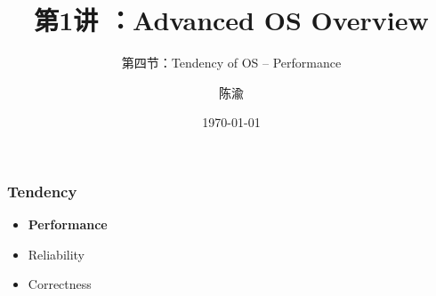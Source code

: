 


\title[第1讲]{第1讲 ：Advanced OS Overview} %
\subtitle{第四节：Tendency of OS -- Performance}
\author{陈渝} %
\date{\today} %




\begin{frame}
\titlepage %
\end{frame}

%
%
\begin{frame}
	\frametitle{Tendency}

	\begin{itemize}\huge
	\item \textbf{Performance}
	\item Reliability
	\item Correctness
	
\end{itemize}
\end{frame}



